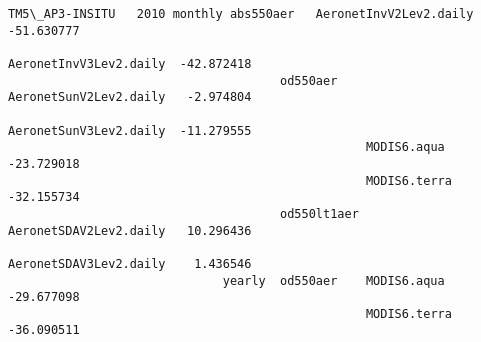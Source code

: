 \documentclass[11pt]{article}
\begin{document}
\begin{Verbatim}[commandchars=\\\{\}]
        TM5\_AP3-INSITU   2010 monthly abs550aer   AeronetInvV2Lev2.daily  -51.630777   
                                                  AeronetInvV3Lev2.daily  -42.872418   
                                      od550aer    AeronetSunV2Lev2.daily   -2.974804   
                                                  AeronetSunV3Lev2.daily  -11.279555   
                                                  MODIS6.aqua             -23.729018   
                                                  MODIS6.terra            -32.155734   
                                      od550lt1aer AeronetSDAV2Lev2.daily   10.296436   
                                                  AeronetSDAV3Lev2.daily    1.436546   
                              yearly  od550aer    MODIS6.aqua             -29.677098   
                                                  MODIS6.terra            -36.090511   
        

\end{Verbatim}
\end{document}
